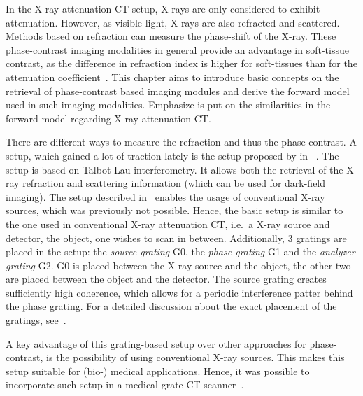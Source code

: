 In the X-ray attenuation CT setup, X-rays are only considered to exhibit attenuation. However, as
visible light, X-rays are also refracted and scattered. Methods based on refraction can measure the
phase-shift of the X-ray. These phase-contrast imaging modalities in general provide an advantage in
soft-tissue contrast, as the difference in refraction index is higher for soft-tissues than for the
attenuation coefficient~\cite{pfeiffer_phase_2006}. This chapter aims to introduce basic concepts on
the retrieval of phase-contrast based imaging modules and derive the forward model used in such
imaging modalities. Emphasize is put on the similarities in the forward model regarding X-ray
attenuation CT\@.

There are different ways to measure the refraction and thus the phase-contrast. A setup, which
gained a lot of traction lately is the setup proposed by \citeauthor*{pfeiffer_phase_2006} in
~\cite{pfeiffer_phase_2006,pfeiffer_hard-x-ray_2008}. The setup is based on Talbot-Lau
interferometry. It allows both the retrieval of the X-ray refraction and scattering information
(which can be used for dark-field imaging). The setup described in~\cite{pfeiffer_hard-x-ray_2008}
enables the usage of conventional X-ray sources, which was previously not possible. Hence, the basic
setup is similar to the one used in conventional X-ray attenuation CT, i.e.\ a X-ray source and
detector, the object, one wishes to scan in between. Additionally, 3 gratings are placed in the
setup: the \textit{source grating} G0, the \textit{phase-grating} G1 and the \textit{analyzer
	grating} G2. G0 is placed between the X-ray source and the object, the other two are placed between
the object and the detector. The source grating creates sufficiently high coherence, which allows
for a periodic interference patter behind the phase grating. For a detailed discussion about the
exact placement of the gratings, see~\cite{donath_inverse_2009}.

A key advantage of this grating-based setup over other approaches for phase-contrast, is the
possibility of using conventional X-ray sources. This makes this setup suitable for (bio-) medical
applications. Hence, it was possible to incorporate such setup in a medical grate CT
scanner~\cite{viermetz_dark-field_2022}.

